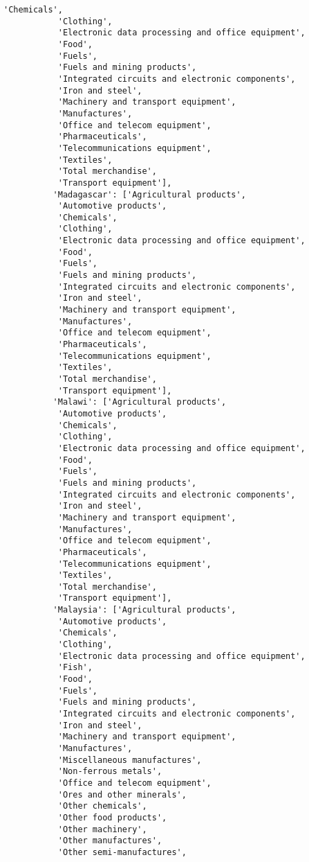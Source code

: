 \documentclass[11pt]{article}
\begin{document}
\begin{Verbatim}[commandchars=\\\{\}]
           'Chemicals',
           'Clothing',
           'Electronic data processing and office equipment',
           'Food',
           'Fuels',
           'Fuels and mining products',
           'Integrated circuits and electronic components',
           'Iron and steel',
           'Machinery and transport equipment',
           'Manufactures',
           'Office and telecom equipment',
           'Pharmaceuticals',
           'Telecommunications equipment',
           'Textiles',
           'Total merchandise',
           'Transport equipment'],
          'Madagascar': ['Agricultural products',
           'Automotive products',
           'Chemicals',
           'Clothing',
           'Electronic data processing and office equipment',
           'Food',
           'Fuels',
           'Fuels and mining products',
           'Integrated circuits and electronic components',
           'Iron and steel',
           'Machinery and transport equipment',
           'Manufactures',
           'Office and telecom equipment',
           'Pharmaceuticals',
           'Telecommunications equipment',
           'Textiles',
           'Total merchandise',
           'Transport equipment'],
          'Malawi': ['Agricultural products',
           'Automotive products',
           'Chemicals',
           'Clothing',
           'Electronic data processing and office equipment',
           'Food',
           'Fuels',
           'Fuels and mining products',
           'Integrated circuits and electronic components',
           'Iron and steel',
           'Machinery and transport equipment',
           'Manufactures',
           'Office and telecom equipment',
           'Pharmaceuticals',
           'Telecommunications equipment',
           'Textiles',
           'Total merchandise',
           'Transport equipment'],
          'Malaysia': ['Agricultural products',
           'Automotive products',
           'Chemicals',
           'Clothing',
           'Electronic data processing and office equipment',
           'Fish',
           'Food',
           'Fuels',
           'Fuels and mining products',
           'Integrated circuits and electronic components',
           'Iron and steel',
           'Machinery and transport equipment',
           'Manufactures',
           'Miscellaneous manufactures',
           'Non-ferrous metals',
           'Office and telecom equipment',
           'Ores and other minerals',
           'Other chemicals',
           'Other food products',
           'Other machinery',
           'Other manufactures',
           'Other semi-manufactures',

\end{Verbatim}
\end{document}

